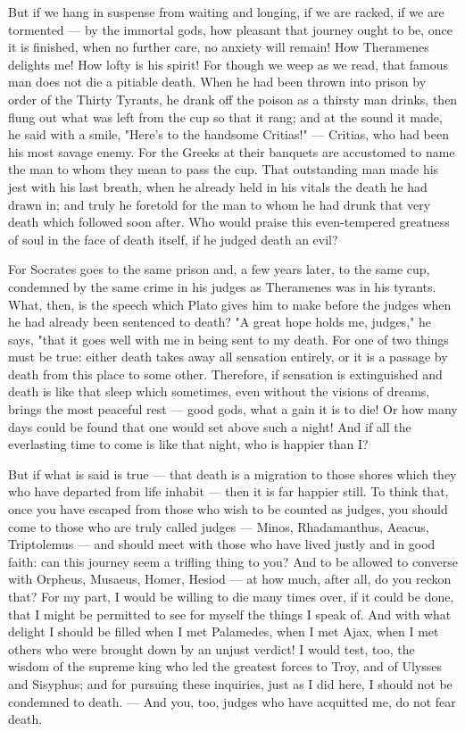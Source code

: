  But if we hang in suspense from waiting and longing, if we are racked, if we are tormented — by the immortal gods, how pleasant that journey ought to be, once it is finished, when no further care, no anxiety will remain! How Theramenes delights me! How lofty is his spirit! For though we weep as we read, that famous man does not die a pitiable death. When he had been thrown into prison by order of the Thirty Tyrants, he drank off the poison as a thirsty man drinks, then flung out what was left from the cup so that it rang; and at the sound it made, he said with a smile, "Here's to the handsome Critias!" — Critias, who had been his most savage enemy. For the Greeks at their banquets are accustomed to name the man to whom they mean to pass the cup. That outstanding man made his jest with his last breath, when he already held in his vitals the death he had drawn in; and truly he foretold for the man to whom he had drunk that very death which followed soon after. Who would praise this even-tempered greatness of soul in the face of death itself, if he judged death an evil?

 For Socrates goes to the same prison and, a few years later, to the same cup, condemned by the same crime in his judges as Theramenes was in his tyrants. What, then, is the speech which Plato gives him to make before the judges when he had already been sentenced to death? "A great hope holds me, judges," he says, "that it goes well with me in being sent to my death. For one of two things must be true: either death takes away all sensation entirely, or it is a passage by death from this place to some other. Therefore, if sensation is extinguished and death is like that sleep which sometimes, even without the visions of dreams, brings the most peaceful rest — good gods, what a gain it is to die! Or how many days could be found that one would set above such a night! And if all the everlasting time to come is like that night, who is happier than I?

 But if what is said is true — that death is a migration to those shores which they who have departed from life inhabit — then it is far happier still. To think that, once you have escaped from those who wish to be counted as judges, you should come to those who are truly called judges — Minos, Rhadamanthus, Aeacus, Triptolemus — and should meet with those who have lived justly and in good faith: can this journey seem a trifling thing to you? And to be allowed to converse with Orpheus, Musaeus, Homer, Hesiod — at how much, after all, do you reckon that? For my part, I would be willing to die many times over, if it could be done, that I might be permitted to see for myself the things I speak of. And with what delight I should be filled when I met Palamedes, when I met Ajax, when I met others who were brought down by an unjust verdict! I would test, too, the wisdom of the supreme king who led the greatest forces to Troy, and of Ulysses and Sisyphus; and for pursuing these inquiries, just as I did here, I should not be condemned to death. — And you, too, judges who have acquitted me, do not fear death.

